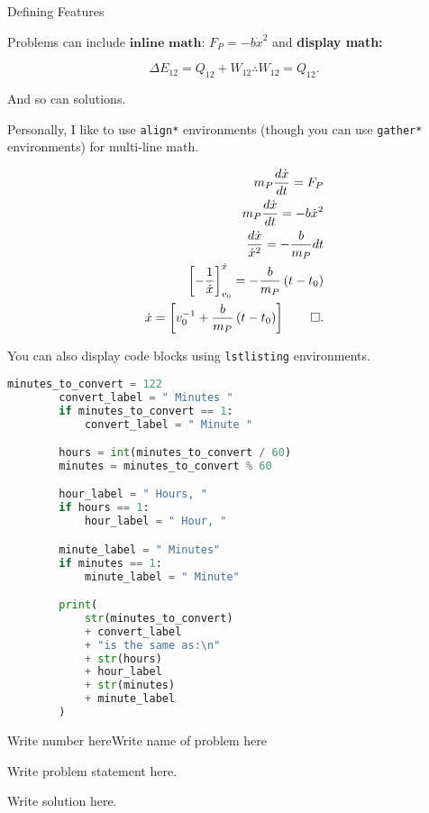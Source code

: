 \begin{hwkProblem}{2}{Defining Features}
		
	Problems can include \( \textbf{inline math: } F_{P} = - b \dot{x}^{2} \) and \textbf{display math:}

	\[
		\Delta E_{12} = Q_{12} + W_{12} \therefore W_{12} = Q_{12}
	.\]
	
	\hwkSol{}

	And so can solutions.

	Personally, I like to use \lstinline{align*} environments (though you can use \lstinline{gather*} environments) for multi-line math.

	\begin{align*}
		m_{P} \frac{d\dot{x}}{dt}                             = F_{P}                                     \\
		m_{P} \frac{d\dot{x}}{dt}                             = -b\dot{x}^{2}                             \\
		\frac{d\dot{x}}{\dot{x}^2}                            = - \frac{b}{m_{P}} dt                      \\
		{\left[ - \frac{1}{\dot{x}} \right]}^{\dot{x}}_{v_{0}}  = - \frac{b}{m_{P}} \left( t - t_{0} \right) \\
		\dot{x}                                               = \left[ v_{0}^{-1} + \frac{b}{m_{P}} \left( t - t_{0} \right) \right] \qed
		.\end{align*}

	You can also display code blocks using \lstinline{lstlisting} environments.

	\begin{lstlisting}[language=python]
		minutes_to_convert = 122
		convert_label = " Minutes "
		if minutes_to_convert == 1:
		    convert_label = " Minute "

		hours = int(minutes_to_convert / 60)
		minutes = minutes_to_convert % 60

		hour_label = " Hours, "
		if hours == 1:
		    hour_label = " Hour, "

		minute_label = " Minutes"
		if minutes == 1:
		    minute_label = " Minute"

		print(
		    str(minutes_to_convert)
		    + convert_label
		    + "is the same as:\n"
		    + str(hours)
		    + hour_label
		    + str(minutes)
		    + minute_label
		)
	\end{lstlisting}

\end{hwkProblem}

\begin{hwkProblem}{Write number here}{Write name of problem here}

	Write problem statement here.

	\hwkSol{}

	Write solution here.

\end{hwkProblem}


